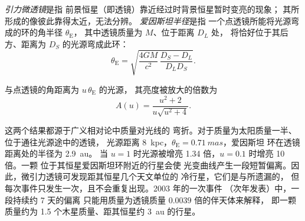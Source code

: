 \begin{definition}\label{def:b3:exoplanets:microlensing}
\emph{引力微透镜}是指
前景恒星（即透镜）靠近经过时背景恒星暂时变亮的现象；
其所形成的像彼此靠得太近，无法分辨。
\emph{爱因斯坦半径}是指
一个点透镜所能将光源弯成的环的角半径 $\theta_\mathrm E$，
其中透镜质量为 $M$、位于距离 $D_L$ 处，
将恰好位于其后方、距离为 $D_S$ 的光源弯成此环：
\[
\theta_\mathrm E = \sqrt{\frac{4GM}{c^2}\,\frac{D_S - D_L}{D_L D_S}} .
\]
\end{definition}

\begin{proposition}[点透镜放大率]\label{prop:b3:exoplanets:magnification}
与点透镜的角距离为 $u\,\theta_\mathrm E$ 的光源，
其亮度被放大的倍数为
\[
A(u) = \frac{u^2 + 2}{u\sqrt{u^2 + 4}} .
\]
\end{proposition}

\admitted

这两个结果都源于广义相对论中质量对光线的
弯折。对于质量为太阳质量一半、位于通往光源途中的透镜，
光源距离 \qty{8}{kpc}，$\theta_\mathrm E = \qty{0.71}{mas}$，爱因斯坦
环在透镜距离处的半径为 \qty{2.9}{au}。
当 $u = 1$ 时光源被增亮 1.34 倍，$u = 0.1$ 时增亮 10 倍。一颗
位于其恒星爱因斯坦环附近的行星会使
光变曲线产生一段短暂偏离。因此，微引力透镜可发现距其恒星几个天文单位的
冷行星，它们是与所遗漏的，
但每次事件只发生一次，且不会重复出现。2003 年的一次事件
（次年发表）中，一段持续约 7 天的偏离
只能用质量为透镜质量 $\num{0.0039}$ 倍的伴天体来解释，
即一颗质量约为 1.5 个木星质量、距其恒星约
\qty{3}{au} 的行星。

